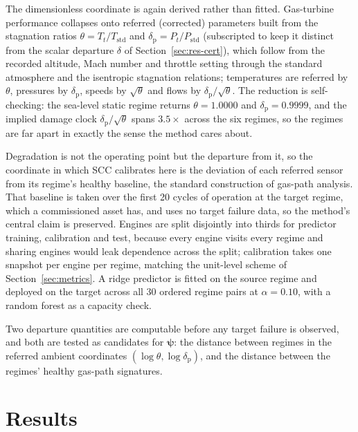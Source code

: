 \documentclass[review,times]{elsarticle}
\theoremstyle{definition}
\theoremstyle{remark}
\begin{document}
The dimensionless coordinate is again derived rather than fitted. Gas-turbine performance collapses
onto referred (corrected) parameters built from the stagnation ratios $\theta=T_t/T_{\mathrm{std}}$
and $\delta_{\mathrm{p}}=P_t/P_{\mathrm{std}}$ (subscripted to keep it distinct from the scalar
departure $\delta$ of Section~\ref{sec:res-cert}), which follow from the recorded altitude, Mach
number and throttle setting through the standard atmosphere and the isentropic stagnation
relations; temperatures are referred by $\theta$, pressures by $\delta_{\mathrm{p}}$, speeds by
$\sqrt{\theta}$ and flows by $\delta_{\mathrm{p}}/\sqrt{\theta}$. The reduction is self-checking:
the sea-level
static regime returns $\theta=1.0000$ and $\delta_{\mathrm{p}}=0.9999$, and the implied damage clock
$\delta_{\mathrm{p}}/\sqrt{\theta}$ spans $3.5\times$ across the six regimes, so the regimes are far
apart in exactly the sense the method cares about.

Degradation is not the operating point but the departure from it, so the coordinate in which SCC
calibrates here is the deviation of each referred sensor from its regime's healthy baseline, the
standard construction of gas-path analysis. That baseline is taken over the first 20 cycles of
operation at the target regime, which a commissioned asset has, and uses no target failure data, so
the method's central claim is preserved. Engines are split disjointly into thirds for predictor
training, calibration and test, because every engine visits every regime and sharing engines would
leak dependence across the split; calibration takes one snapshot per engine per regime, matching the
unit-level scheme of Section~\ref{sec:metrics}. A ridge predictor is fitted on the source regime and
deployed on the target across all 30 ordered regime pairs at $\alpha=0.10$, with a random forest as
a capacity check.

Two departure quantities are computable before any target failure is observed, and both are tested
as candidates for $\boldsymbol\psi$: the distance between regimes in the referred ambient
coordinates $(\log\theta,\log\delta_{\mathrm{p}})$, and the distance between the regimes' healthy
gas-path signatures.
\section{Results}\label{sec:results}
\end{document}
